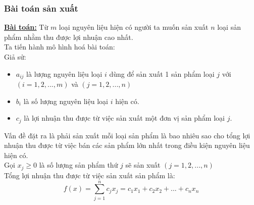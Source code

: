 \documentclass{article}
\begin{document}
\subsubsection{Bài toán sản xuất}
\textbf{\underline{Bài toán:}} Từ $m$ loại nguyên liệu hiện có người ta muốn sản xuất $n$ loại sản phẩm nhằm thu được lợi nhuận cao nhất.\medskip \\
\indent Ta tiến hành mô hình hoá bài toán:\medskip \\
\indent Giả sử:
\begin{itemize}
    \item $a_{ij}$ là lượng nguyên liệu loại $i$ dùng để sản xuất 1 sản phẩm loại $j$ với $(i=1,2,...,m)$ và $(j=1,2,...,n)$
    \item $b_i$ là số lượng nguyên liệu loại $i$ hiện có.
    \item $c_j$ là lợi nhuận thu được từ việc sản xuất một đơn vị sản phẩm loại $j$.
\end{itemize}
\hspace{0.4cm} Vấn đề đặt ra là phải sản xuất mỗi loại sản phẩm là bao nhiêu sao cho tổng lợi nhuận thu được từ việc bán các sản phẩm lớn nhất trong điều kiện nguyên liệu hiện có. \medskip \\
\indent Gọi $x_j \geq 0$ là số lượng sản phẩm thứ $j$ sẽ sản xuất $(j=1,2,...,n)$ \medskip \\
\indent Tổng lợi nhuận thu được từ việc sản xuất sản phẩm là:
\begin{equation*}
    f(x) =\sum_{j=1}^n c_jx_j = c_1x_1 + c_2x_2 + ... + c_nx_n
\end{equation*}
\end{document}

